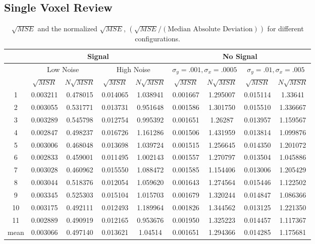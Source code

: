 \subsection{Single Voxel Review}
\begin{table}[t]
\centering
\begin{tabular}{|c | c | c | c | c | c | c | c | c |}
\hline 
& \multicolumn{4}{|c|}{Signal} & \multicolumn{4}{|c|}{No Signal}\\
\hline
& \multicolumn{2}{|c|}{Low Noise} & \multicolumn{2}{|c|}{High Noise} 
& \multicolumn{2}{|c|}{$\sigma_y = .001, \sigma_x = .0005$} 
& \multicolumn{2}{|c|}{$\sigma_y = .01, \sigma_x = .005$}\\
\hline 
&$\sqrt{MSR}$ & $N\sqrt{MSR}$ &
 $\sqrt{MSR}$ & $N\sqrt{MSR}$ &
 $\sqrt{MSR}$ & $N\sqrt{MSR}$ &
 $\sqrt{MSR}$ & $N\sqrt{MSR}$ \\
\hline       
\hline       
1 & 0.003211 & 0.478015  & 0.014065  & 1.038941    &0.001667 & 1.295007 & 0.015114 & 1.33641 \\
2 & 0.003055 & 0.531771  & 0.013731  & 0.951648  &  0.001586 & 1.301750 & 0.015510 & 1.336667 \\
3 & 0.003289 & 0.545798  & 0.012754 &  0.995392  &  0.001651 & 1.26287 &  0.013957 & 1.159567 \\
4 & 0.002847 & 0.498237  & 0.016726  & 1.161286  &  0.001506 & 1.431959 & 0.013814 & 1.099876 \\
5 & 0.003006 & 0.468048  & 0.013698 &  1.039724   & 0.001515 & 1.256645 & 0.014350 & 1.201072 \\
6 & 0.002833 & 0.459001  & 0.011495 &  1.002143  &  0.001557 & 1.270797 & 0.013504 & 1.045886 \\
7 & 0.003028 & 0.460962  & 0.015550 &  1.088472   & 0.001585 & 1.154406 & 0.013006 & 1.205429 \\
8 & 0.003044 & 0.518376  & 0.012054 &  1.059620  &  0.001643 & 1.274564 & 0.015446 & 1.122502 \\
9 & 0.003345 & 0.525303  & 0.015104 &  1.015703  &  0.001679 & 1.320244 & 0.014847 & 1.086366 \\
10 & 0.003175 &0.492111  & 0.012493  & 1.189964  &  0.001826 & 1.344562 & 0.013125 & 1.221350 \\
11 & 0.002889 &0.490919  & 0.012165 &  0.953676  &  0.001950 & 1.325223 & 0.014457 & 1.117367 \\
\hline
mean & 0.003066 & 0.497140  & 0.013621 &  1.04514   &  0.001651 & 1.294366 & 0.014285 & 1.175681 \\
\hline
\end{tabular}
\caption{$\sqrt{MSE}$ and the normalized $\sqrt{MSE}$, 
    $\left(\sqrt{MSE}/(\text{Median Absolute Deviation})\right)$ for different configurations.} 
\label{tab:SignleVoxelActivationComparison} 
\end{table}

